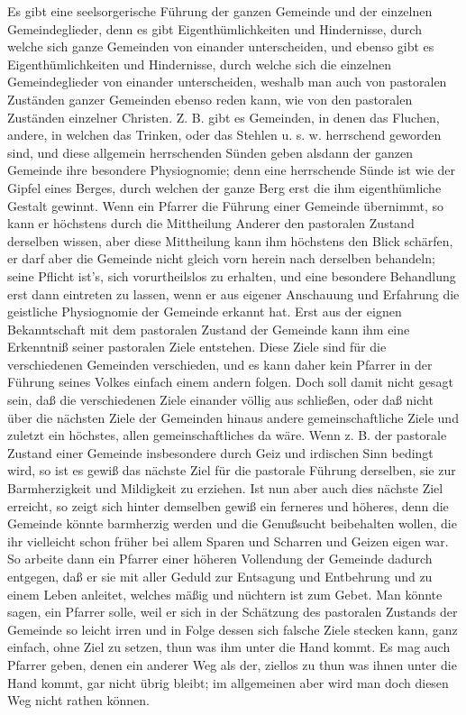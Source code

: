 Es gibt eine seelsorgerische Führung der ganzen Gemeinde und der einzelnen Gemeindeglieder, denn
es gibt Eigenthümlichkeiten und Hindernisse, durch welche sich ganze Gemeinden von einander unterscheiden, und ebenso gibt es Eigenthümlichkeiten und Hindernisse, durch welche sich die einzelnen Gemeindeglieder von einander unterscheiden, weshalb man auch von pastoralen Zuständen ganzer Gemeinden ebenso reden kann, wie von den pastoralen Zuständen einzelner Christen. Z. B. gibt es Gemeinden, in denen das Fluchen, andere, in welchen das Trinken, oder das Stehlen u. s. w. herrschend geworden sind, und diese allgemein herrschenden Sünden geben alsdann der ganzen Gemeinde ihre besondere Physiognomie; denn eine herrschende Sünde ist wie der Gipfel eines Berges, durch welchen der ganze Berg erst die ihm eigenthümliche Gestalt gewinnt. Wenn ein Pfarrer die Führung einer Gemeinde übernimmt, so kann er höchstens durch die Mittheilung Anderer den pastoralen Zustand derselben wissen, aber diese Mittheilung kann ihm höchstens den Blick schärfen, er darf aber die Gemeinde nicht gleich vorn herein nach derselben behandeln; seine Pflicht ist's, sich vorurtheilslos zu erhalten, und eine besondere Behandlung erst dann eintreten zu lassen, wenn er aus eigener Anschauung und Erfahrung die geistliche Physiognomie der Gemeinde erkannt hat. Erst aus der eignen Bekanntschaft mit dem pastoralen Zustand der Gemeinde kann ihm eine Erkenntniß seiner pastoralen Ziele entstehen. Diese Ziele sind für die verschiedenen Gemeinden verschieden, und es kann daher kein Pfarrer in der Führung seines Volkes einfach einem andern folgen. Doch soll damit nicht gesagt sein, daß die verschiedenen Ziele einander völlig aus%
schließen, oder daß nicht über die nächsten Ziele der Gemeinden hinaus andere gemeinschaftliche Ziele und zuletzt ein höchstes, allen gemeinschaftliches da wäre. Wenn z. B. der pastorale Zustand einer Gemeinde insbesondere durch Geiz und irdischen Sinn bedingt wird, so ist es gewiß das nächste Ziel für die pastorale Führung derselben, sie zur Barmherzigkeit und Mildigkeit zu erziehen. Ist nun aber auch dies nächste Ziel erreicht, so zeigt sich hinter demselben gewiß ein ferneres und höheres, denn die Gemeinde könnte barmherzig werden und die Genußsucht beibehalten wollen, die ihr vielleicht schon früher bei allem Sparen und Scharren und Geizen eigen war. So arbeite dann ein Pfarrer einer höheren Vollendung der Gemeinde dadurch entgegen, daß er sie mit aller Geduld zur Entsagung und Entbehrung und zu einem Leben anleitet, welches mäßig und nüchtern ist zum Gebet. Man könnte sagen, ein Pfarrer solle, weil er sich in der Schätzung des pastoralen Zustands der Gemeinde so leicht irren und in Folge dessen sich falsche Ziele stecken kann, ganz einfach, ohne Ziel zu setzen, thun was ihm unter die Hand kommt. Es mag auch Pfarrer geben, denen ein anderer Weg als der, ziellos zu thun was ihnen unter die Hand kommt, gar nicht übrig bleibt; im allgemeinen aber wird man doch diesen Weg nicht rathen können.

